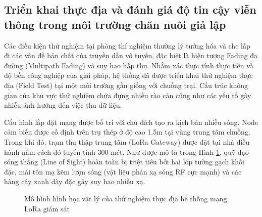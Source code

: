 \subsection{Triển khai thực địa  và đánh giá độ tin cậy viễn thông trong môi trường chăn nuôi giả lập}

Các điều kiện thử nghiệm tại phòng thí nghiệm thường lý tưởng hóa và che lấp đi các vấn đề bản chất của truyền dẫn vô tuyến, đặc biệt là hiện tượng Fading đa đường (Multipath Fading) và suy hao hấp thụ. Nhằm xác thực tính thực tiễn và độ bền công nghiệp của giải pháp, hệ thống đã được triển khai thử nghiệm thực địa (Field Test) tại một môi trường gần giống với chuồng trại. Cấu trúc không gian của khu vực thử nghiệm chứa đựng nhiều rào cản cũng như các yếu tố gây nhiễu ảnh hưởng đến việc thu dữ liệu.

Cấu hình lắp đặt mạng được bố trí với chủ đích tạo ra kịch bản nhiễu sóng. Node cảm biến được cố định trên trụ thép ở độ cao 1.5m tại vùng trung tâm chuồng. Trong khi đó, trạm thu thập trung tâm (LoRa Gateway) được đặt tại nhà điều hành nằm cách đó tuyến tính 300 mét. Như được mô tả trong Hình \ref{fig:field_topology}, quỹ đạo sóng thẳng (Line of Sight) hoàn toàn bị triệt tiêu bởi hai lớp tường gạch khối đặc, mái tôn mạ kẽm lượn sóng (vật liệu phản xạ sóng RF cực mạnh) và các hàng cây xanh dày đặc gây suy hao nhiễu xạ.

\begin{figure}[htbp]
\centering
{}
\caption{Mô hình hình học vật lý của thử nghiệm thực địa hệ thống mạng LoRa giám sát}
\label{fig:field_topology}
\end{figure}


